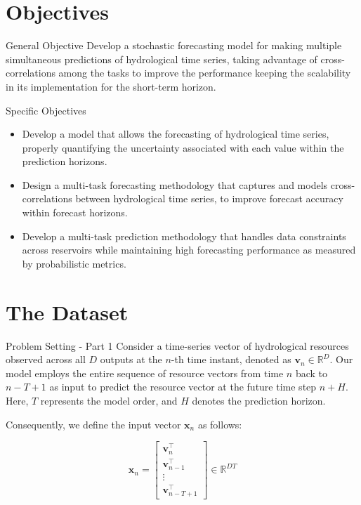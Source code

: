\documentclass[10pt, xcolor=table]{beamer}
\begin{document}
\section{Objectives}
\begin{frame}{General Objective}
	Develop a stochastic forecasting model for making multiple simultaneous predictions of hydrological time series, taking advantage of cross-correlations among the tasks to improve the performance keeping the scalability in its implementation for the short-term horizon.	
\end{frame}

\begin{frame}{Specific Objectives}
	\begin{itemize}
		\item Develop a model that allows the forecasting of hydrological time series, properly quantifying the uncertainty associated with each value within the prediction horizons.
		\item Design a multi-task forecasting methodology that captures and models cross-correlations between hydrological time series, to improve forecast accuracy within forecast horizons.
		\item Develop a multi-task prediction methodology that handles data constraints across reservoirs while maintaining high forecasting performance as measured by probabilistic metrics.
		
	\end{itemize}
\end{frame}

\section{The Dataset}
\begin{frame}{Problem Setting - Part 1}
	Consider a time-series vector of hydrological resources observed across all $D$ outputs at the $n$-th time instant, denoted as $\mathbf{v}_n \in \mathbb{R}^D$. Our model employs the entire sequence of resource vectors from time $n$ back to $n-T+1$ as input to predict the resource vector at the future time step $n+H$. Here, $T$ represents the model order, and $H$ denotes the prediction horizon. 
	
	Consequently, we define the input vector $\mathbf{x}_n$ as follows:
	
	\begin{equation*}
	\mathbf{x}_n = \begin{bmatrix} 
	\mathbf{v}_{n}^\top \\ 
	\mathbf{v}_{n-1}^\top \\ 
	\vdots \\ 
	\mathbf{v}_{n-T+1}^\top 
	\end{bmatrix} \in \mathbb{R}^{DT}
	\end{equation*}
\end{frame}
\end{document}
